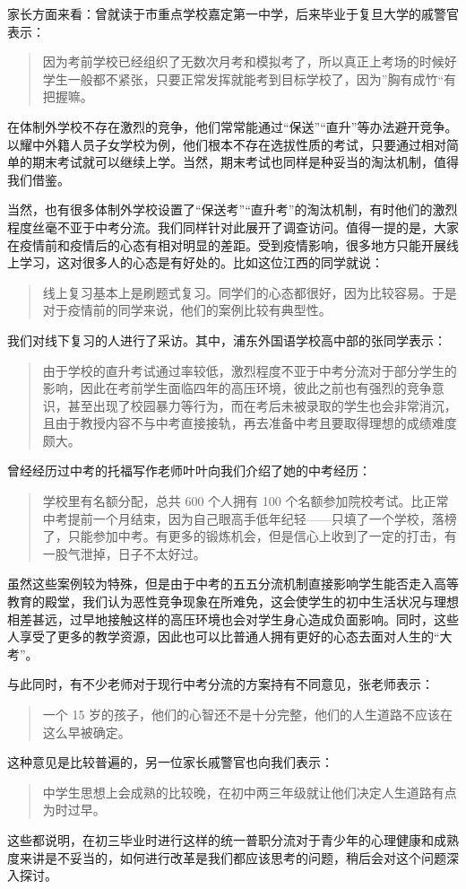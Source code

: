 \documentclass[12pt,UTF8]{ctexart}
\begin{document}
\par{
	家长方面来看：曾就读于市重点学校嘉定第一中学，后来毕业于复旦大学的戚警官表示：
	\begin{quote}
		\kaishu
		因为考前学校已经组织了无数次月考和模拟考了，所以真正上考场的时候好学生一般都不紧张，只要正常发挥就能考到目标学校了，因为”胸有成竹“有把握嘛。
	\end{quote}
}
\par{在体制外学校不存在激烈的竞争，他们常常能通过“保送”“直升”等办法避开竞争。以耀中外籍人员子女学校为例，他们根本不存在选拔性质的考试，只要通过相对简单的期末考试就可以继续上学。当然，期末考试也同样是种妥当的淘汰机制，值得我们借鉴。}
\par{
	
	当然，也有很多体制外学校设置了“保送考”“直升考”的淘汰机制，有时他们的激烈程度丝毫不亚于中考分流。我们同样针对此展开了调查访问。值得一提的是，大家在疫情前和疫情后的心态有相对明显的差距。受到疫情影响，很多地方只能开展线上学习，这对很多人的心态是有好处的。比如这位江西的同学就说：
	\begin{quote}
		\kaishu 线上复习基本上是刷题式复习。同学们的心态都很好，因为比较容易。于是对于疫情前的同学来说，他们的案例比较有典型性。
	\end{quote}
	我们对线下复习的人进行了采访。其中，浦东外国语学校高中部的张同学表示：
	\begin{quote}
		\kaishu
		由于学校的直升考试通过率较低，激烈程度不亚于中考分流对于部分学生的影响，因此在考前学生面临四年的高压环境，彼此之前也有强烈的竞争意识，甚至出现了校园暴力等行为，而在考后未被录取的学生也会非常消沉，且由于教授内容不与中考直接接轨，再去准备中考且要取得理想的成绩难度颇大。
	\end{quote}
	曾经经历过中考的托福写作老师叶叶向我们介绍了她的中考经历：
	\begin{quote}
		\kaishu 学校里有名额分配，总共 600 个人拥有 100
		个名额参加院校考试。比正常中考提前一个月结束，因为自己眼高手低年纪轻——只填了一个学校，落榜了，只能参加中考。有更多的锻炼机会，但是信心上收到了一定的打击，有一股气泄掉，日子不太好过。
	\end{quote}
	
	虽然这些案例较为特殊，但是由于中考的五五分流机制直接影响学生能否走入高等教育的殿堂，我们认为恶性竞争现象在所难免，这会使学生的初中生活状况与理想相差甚远，过早地接触这样的高压环境也会对学生身心造成负面影响。同时，这些人享受了更多的教学资源，因此也可以比普通人拥有更好的心态去面对人生的“大考”。
}
\par{
	与此同时，有不少老师对于现行中考分流的方案持有不同意见，张老师表示：
	\begin{quote}
		\kaishu 一个 15 岁的孩子，他们的心智还不是十分完整，他们的人生道路不应该在这么早被确定。
	\end{quote}
	这种意见是比较普遍的，另一位家长戚警官也向我们表示：
	\begin{quote}
		\kaishu 中学生思想上会成熟的比较晚，在初中两三年级就让他们决定人生道路有点为时过早。
	\end{quote}
	这些都说明，在初三毕业时进行这样的统一普职分流对于青少年的心理健康和成熟度来讲是不妥当的，如何进行改革是我们都应该思考的问题，稍后会对这个问题深入探讨。
}
\end{document}
